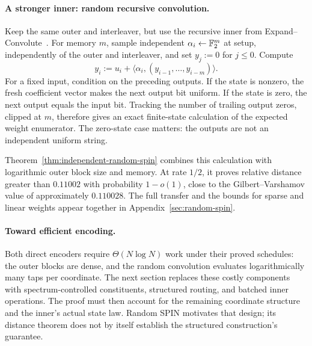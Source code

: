 \paragraph{A stronger inner: random recursive convolution.}
Keep the same outer and interleaver, but use the recursive inner from
Expand--Convolute~\cite{RaghuramanRindalTanguy2023EC}. For memory $m$, sample
independent $\alpha_i\gets\mathbb F_2^m$ at setup, independently of the outer and
interleaver, and set $y_j:=0$ for $j\le0$. Compute
\[
 y_i:=u_i+\langle\alpha_i,(y_{i-1},\ldots,y_{i-m})\rangle.
\]
For a fixed input, condition on the preceding outputs. If the state is
nonzero, the fresh coefficient vector makes the next output bit uniform.
If the state is zero, the next output equals the input bit. Tracking the
number of trailing output zeros, clipped at $m$, therefore gives an exact
finite-state calculation of the expected weight enumerator. The zero-state
case matters: the outputs are not an independent uniform string.

Theorem~\ref{thm:independent-random-spin} combines this calculation with
logarithmic outer block size and memory. At rate $1/2$, it proves relative
distance greater than $0.11002$ with probability $1-o(1)$, close to the
Gilbert--Varshamov value of approximately $0.110028$. The full transfer and
the bounds for sparse and linear weights appear together in
Appendix~\ref{sec:random-spin}.

\paragraph{Toward efficient encoding.}
Both direct encoders require $\Theta(N\log N)$ work under their proved
schedules: the outer blocks are dense, and the random convolution evaluates
logarithmically many taps per coordinate. The next section replaces these
costly components with spectrum-controlled constituents, structured routing,
and batched inner operations. The proof must then account for the remaining
coordinate structure and the inner's actual state law. Random SPIN motivates
that design; its distance theorem does not by itself establish the
structured construction's guarantee.
